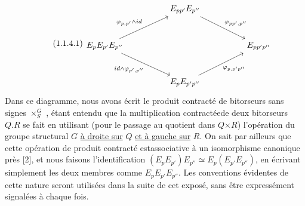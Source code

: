 \begin{equation}\tag{1.1.4.1}
\begin{tikzcd}[column sep=huge, row sep=large]
 & E_{pp'}E_{p''} \arrow[dr, "{\varphi_{pp',p''}}"] & \\
E_{p}E_{p'}E_{p''} \arrow[ur, "{\varphi_{p,p'}\wedge id}"] \arrow[dr, "{id\wedge\varphi_{p',p''}}"'] & & E_{pp'p''} \\
 & E_{p}E_{p'p''} \arrow[ur, "{\varphi_{p,p'p''}}"'] &
\end{tikzcd}
\end{equation}
Dans ce diagramme, nous avons écrit le produit contracté de bitorseurs sans signes $\times^{G}_{S}$ , étant entendu que la multiplication contractéede deux bitorseurs $Q.R$ se fait en utilisant (pour le passage au quotient dans $Q$$\times$$R$) l'opération du groupe structural $G$ \underline{à droite sur} $Q$ \underline{et à gauche sur} $R$. On sait par ailleurs que cette opération de produit contracté estassociative à un isomorphisme canonique près [2], et nous faisons l'identification $(E_{p}E_{p'})E_{p''} \simeq E_{p}(E_{p'}E_{p''})$, en écrivant simplement les deux membres comme $E_{p}E_{p'}E_{p''}$. Les conventions évidentes de cette nature seront utilisées dans la suite de cet exposé, sans être expressément signalées à chaque fois.

